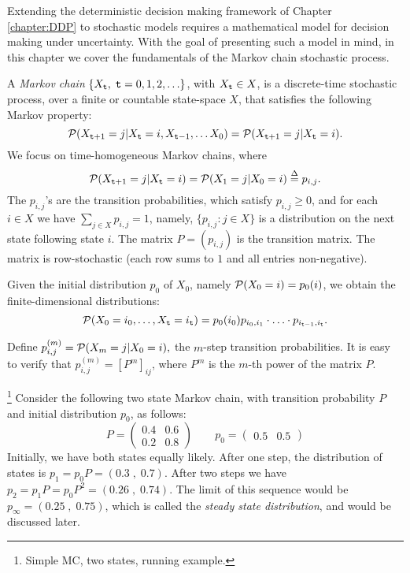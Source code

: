 


Extending the deterministic decision making framework of Chapter \ref{chapter:DDP} to stochastic models requires a mathematical model for decision making under uncertainty. With the goal of presenting such a model in mind, in this chapter we cover the fundamentals of the Markov chain stochastic process.


A \emph{Markov chain} $\{ {X_{\tt t}},\;{\tt t} = 0,1,2, \ldots \} $, with
${X_{\tt t}} \in X$, is a discrete-time stochastic process, over a
finite or countable state-space $X$, that satisfies the following
Markov property:
    \[{\cal P}({X_{{\tt t} +1}} = j|{X_{\tt t}} = i,{X_{{\tt t} - 1}}, \ldots {X_0}) = {\cal P}({X_{{\tt t} +1}} = j|{X_{\tt t}} = i).\]
We focus on time-homogeneous Markov chains, where
\[{\cal P}({X_{\ttime +1}} = j|{X_\ttime} = i) = {\cal P}({X_1} = j|{X_0} = i) \buildrel \Delta \over = {p_{i,j}}.\]
The ${p_{i,j}}$'s  are the transition probabilities, which satisfy
$p_{i,j} \ge 0$, and for each $ i\in X$ we have $\sum_{j \in X}
{{p_{i,j}} = 1} $, namely, $\{p_{i,j}:j\in X\}$ is a distribution on
the next state following state $i$.  The matrix $P = ({p_{i,j}})$ is
the transition matrix. The matrix is row-stochastic (each row sums
to $1$ and all entries non-negative).

Given the initial distribution ${p_0}$ of ${X_0}$, namely ${\cal
P}({X_0} = i) = {p_0}(i)$, we obtain the finite-dimensional
distributions:
\[{\cal P}({X_0} = {i_0}, \ldots ,{X_{\tt t}} = {i_{\tt t}}) = {p_0}(i_0){p_{{i_0},{i_1}}} \cdot  \ldots  \cdot {p_{{i_{{\tt t}- 1}},{i_{\tt t}}}}.\]

Define $p_{i,j}^{(m)} = {\cal P}({X_m} = j|{X_0} = i),$ the $m$-step
transition probabilities.  It is easy to verify that $p_{i,j}^{(m)}
= {[{P^m}]_{ij}}$, where ${P^m}$ is the $m$-th power of the matrix
$P$.

\begin{example}
\footnote{Simple MC, two states, running example.} Consider the
following two state Markov chain, with transition probability $P$
and initial distribution $p_0$, as follows:
$$
P=
\begin{pmatrix}
0.4 & 0.6  \\
0.2 & 0.8
\end{pmatrix}
\qquad p_0=
\begin{pmatrix}
0.5  & 0.5
\end{pmatrix}
$$
Initially, we have both states equally likely. After one step, the
distribution of states is $p_1=p_0 P=(0.3\;,\; 0.7)$. After two
steps we have $p_2=p_1 P=p_0 P^2 = (0.26 \;,\; 0.74 )$. The limit of
this sequence would be $p_\infty =(0.25 \;,\; 0.75)$, which is
called the {\em steady state distribution}, and would be discussed
later.
\end{example}


